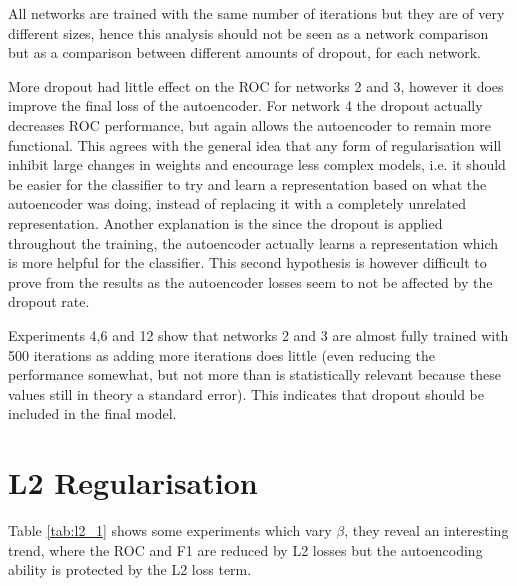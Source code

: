           All networks are trained with the same number of iterations but they are of very different sizes,
          hence this analysis should not be seen as a network comparison but as a comparison between different amounts of dropout, for each network.

          More dropout had little effect on the ROC for networks 2 and 3, however it does
          improve the final loss of the autoencoder. For network 4 the dropout actually decreases
          ROC performance, but again allows the autoencoder to remain more functional. This
          agrees with the general idea that any form of regularisation will inhibit large changes
          in weights and encourage less complex models, i.e. it should be easier for the classifier to try and learn
          a representation based on what the autoencoder was doing, instead of replacing it with a completely unrelated
          representation. Another explanation is the since the dropout is applied throughout the training, the autoencoder
          actually learns a representation which is more helpful for the classifier. This second hypothesis is
          however difficult to prove from the results as the autoencoder losses seem to not be affected by the dropout rate.

          Experiments 4,6 and 12 show that networks 2 and 3 are almost fully trained
          with 500 iterations as adding more iterations does little (even reducing the performance somewhat, but not more than is statistically relevant because
          these values still in theory a standard error). This indicates that dropout should be included in the final model.


          \newpage
        \section{L2 Regularisation}

          Table \ref{tab:l2_1} shows some experiments which vary $\beta$, they reveal an
          interesting trend, where the ROC and F1 are reduced by L2 losses but the autoencoding
          ability is protected by the L2 loss term.

